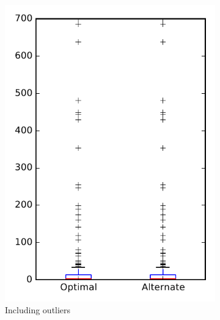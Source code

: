 
\begin{figure}
    \centering
    \begin{subfigure}{.4\textwidth}
        \centering
        \includegraphics[height=0.4\textheight]{figures/combo/flt_rq1_bookkeeper}
        \caption{Including outliers}\label{fig:combo:flt:rq1:bookkeeper_outlier}
    \end{subfigure}%
    \begin{subfigure}{.4\textwidth}
        \centering

\end{subfigure}
\end{figure}
